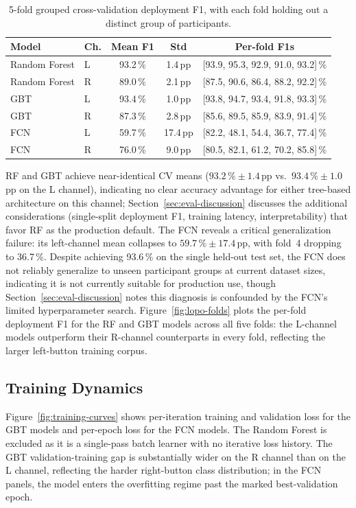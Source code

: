\begin{table}[t]
\centering
\small
\caption{5-fold grouped cross-validation deployment F1, with each fold holding out a
distinct group of participants.}
\label{tab:cv}
\begin{tabular}{llccc}
\toprule
\textbf{Model} & \textbf{Ch.} & \textbf{Mean F1} & \textbf{Std} & \textbf{Per-fold F1s} \\
\midrule
Random Forest & L & 93.2\,\% & 1.4\,pp & [93.9, 95.3, 92.9, 91.0, 93.2]\,\% \\
Random Forest & R & 89.0\,\% & 2.1\,pp & [87.5, 90.6, 86.4, 88.2, 92.2]\,\% \\
GBT           & L & 93.4\,\% & 1.0\,pp & [93.8, 94.7, 93.4, 91.8, 93.3]\,\% \\
GBT           & R & 87.3\,\% & 2.8\,pp & [85.6, 89.5, 85.9, 83.9, 91.4]\,\% \\
FCN           & L & 59.7\,\% & 17.4\,pp & [82.2, 48.1, 54.4, 36.7, 77.4]\,\% \\
FCN           & R & 76.0\,\% & 9.0\,pp & [80.5, 82.1, 61.2, 70.2, 85.8]\,\% \\
\bottomrule
\end{tabular}
\end{table}

RF and GBT achieve near-identical CV means ($93.2\,\% \pm 1.4$\,pp vs.\ $93.4\,\% \pm 1.0$\,pp
on the L channel), indicating no clear accuracy advantage for either tree-based
architecture on this channel; Section~\ref{sec:eval-discussion} discusses the
additional considerations (single-split deployment F1, training latency,
interpretability) that favor RF as the production default.
The FCN reveals a critical generalization failure: its left-channel mean collapses to
$59.7\,\% \pm 17.4$\,pp, with fold~4 dropping to 36.7\,\%. Despite achieving 93.6\,\% on the
single held-out test set, the FCN does not reliably generalize to unseen participant
groups at current dataset sizes, indicating it is not currently suitable for
production use, though Section~\ref{sec:eval-discussion} notes this diagnosis
is confounded by the FCN's limited hyperparameter search. Figure~\ref{fig:lopo-folds} plots
the per-fold deployment F1 for the RF and GBT models across all five folds: the
L-channel models outperform their R-channel counterparts in every fold, reflecting
the larger left-button training corpus.



\subsection{Training Dynamics}
Figure~\ref{fig:training-curves} shows per-iteration training and validation loss for
the GBT models and per-epoch loss for the FCN models. The Random Forest is excluded
as it is a single-pass batch learner with no iterative loss history. The GBT
validation-training gap is substantially wider on the R channel than on the L
channel, reflecting the harder right-button class distribution; in the FCN panels,
the model enters the overfitting regime past the marked best-validation epoch.

